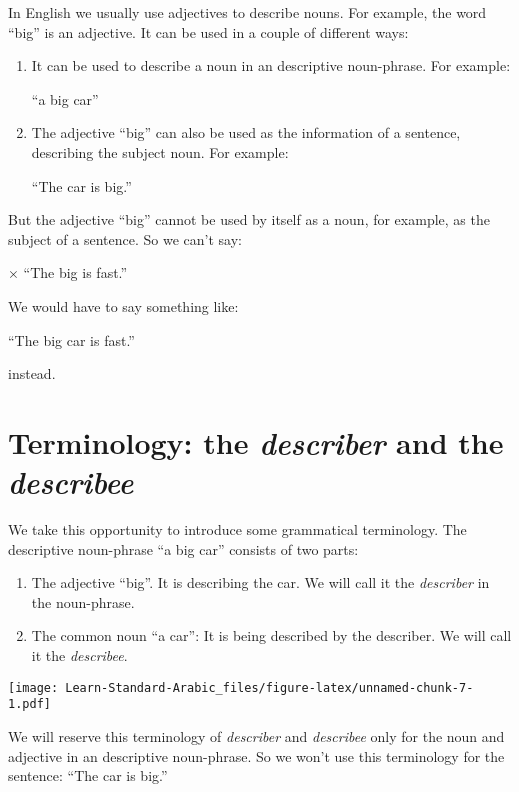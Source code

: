 \documentclass[
  10pt,
]{book}
\providecommand{\tightlist}{%
  \setlength{\itemsep}{0pt}\setlength{\parskip}{0pt}}
\begin{document}
In English we usually use adjectives to describe nouns. For example, the word \enquote{big} is an adjective. It can be used in a couple of different ways:

\begin{enumerate}
\def\labelenumi{\arabic{enumi}.}
\item
  It can be used to describe a noun in an descriptive noun-phrase. For example:

  \enquote{a big car}
\item
  The adjective \enquote{big} can also be used as the information of a sentence, describing the subject noun. For example:

  \enquote{The car is big.}
\end{enumerate}

But the adjective \enquote{big} cannot be used by itself as a noun, for example, as the subject of a sentence. So we can't say:

\(\times\) \enquote{The big is fast.}

We would have to say something like:

\enquote{The big car is fast.}

instead.

\section{\texorpdfstring{Terminology: the \emph{describer} and the \emph{describee}}{Terminology: the describer and the describee}}\label{terminology-the-describer-and-the-describee}

We take this opportunity to introduce some grammatical terminology. The descriptive noun-phrase \enquote{a big car} consists of two parts:

\begin{enumerate}
\def\labelenumi{\roman{enumi}.}
\tightlist
\item
  The adjective \enquote{big}. It is describing the car. We will call it the \emph{describer} in the noun-phrase.
\item
  The common noun \enquote{a car}: It is being described by the describer. We will call it the \emph{describee}.
\end{enumerate}

\texttt{[image: Learn-Standard-Arabic\_files/figure-latex/unnamed-chunk-7-1.pdf]}

We will reserve this terminology of \emph{describer} and \emph{describee} only for the noun and adjective in an descriptive noun-phrase. So we won't use this terminology for the sentence: \enquote{The car is big.}
\end{document}
